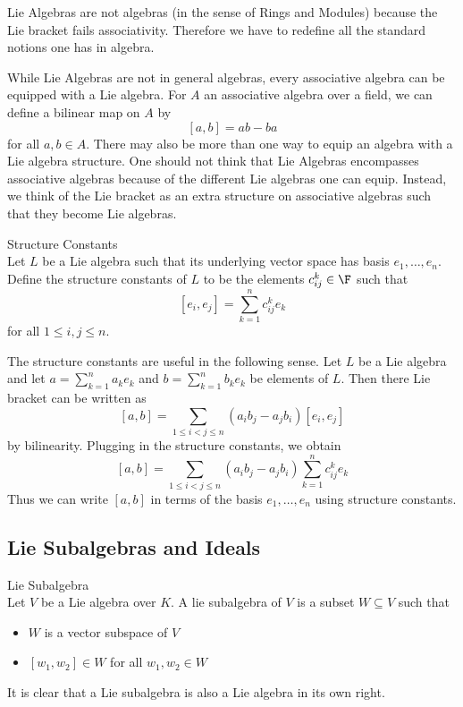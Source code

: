 \documentclass[a4paper]{article}
\begin{document}
Lie Algebras are not algebras (in the sense of Rings and Modules) because the Lie bracket fails associativity. Therefore we have to redefine all the standard notions one has in algebra. 

While Lie Algebras are not in general algebras, every associative algebra can be equipped with a Lie algebra. For $A$ an associative algebra over a field, we can define a bilinear map on $A$ by $$[a,b]=ab-ba$$ for all $a,b\in A$. There may also be more than one way to equip an algebra with a Lie algebra structure. One should not think that Lie Algebras encompasses associative algebras because of the different Lie algebras one can equip. Instead, we think of the Lie bracket as an extra structure on associative algebras such that they become Lie algebras. 

\begin{defn}{Structure Constants}{} \\Let $L$ be a Lie algebra such that its underlying vector space has basis $e_1,\dots,e_n$. Define the structure constants of $L$ to be the elements $c_{ij}^k\in\F$ such that $$[e_i,e_j]=\sum_{k=1}^nc_{ij}^ke_k$$ for all $1\leq i,j\leq n$. 
\end{defn}

The structure constants are useful in the following sense. Let $L$ be a Lie algebra and let $a=\sum_{k=1}^na_ke_k$ and $b=\sum_{k=1}^nb_ke_k$ be elements of $L$. Then there Lie bracket can be written as $$[a,b]=\sum_{1\leq i<j\leq n}(a_ib_j-a_jb_i)[e_i,e_j]$$ by bilinearity. Plugging in the structure constants, we obtain $$[a,b]=\sum_{1\leq i<j\leq n}(a_ib_j-a_jb_i)\sum_{k=1}^nc_{ij}^ke_k$$ Thus we can write $[a,b]$ in terms of the basis $e_1,\dots,e_n$ using structure constants. 

\subsection{Lie Subalgebras and Ideals}
\begin{defn}{Lie Subalgebra}{} \\Let $V$ be a Lie algebra over $K$. A lie subalgebra of $V$ is a subset $W\subseteq V$ such that 
\begin{itemize}
\item $W$ is a vector subspace of $V$
\item $[w_1,w_2]\in W$ for all $w_1,w_2\in W$
\end{itemize}
\end{defn}

It is clear that a Lie subalgebra is also a Lie algebra in its own right. 
\end{document}
